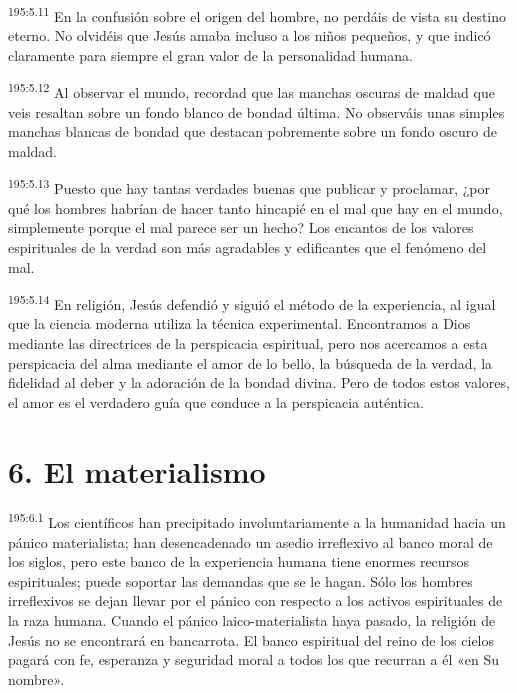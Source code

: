 \par 
\textsuperscript{195:5.11} En la confusión sobre el origen del hombre, no perdáis de vista su destino eterno. No olvidéis que Jesús amaba incluso a los niños pequeños, y que indicó claramente para siempre el gran valor de la personalidad humana.

\par 
\textsuperscript{195:5.12} Al observar el mundo, recordad que las manchas oscuras de maldad que veis resaltan sobre un fondo blanco de bondad última. No observáis unas simples manchas blancas de bondad que destacan pobremente sobre un fondo oscuro de maldad.

\par 
\textsuperscript{195:5.13} Puesto que hay tantas verdades buenas que publicar y proclamar, ¿por qué los hombres habrían de hacer tanto hincapié en el mal que hay en el mundo, simplemente porque el mal parece ser un hecho? Los encantos de los valores espirituales de la verdad son más agradables y edificantes que el fenómeno del mal.

\par 
\textsuperscript{195:5.14} En religión, Jesús defendió y siguió el método de la experiencia, al igual que la ciencia moderna utiliza la técnica experimental. Encontramos a Dios mediante las directrices de la perspicacia espiritual, pero nos acercamos a esta perspicacia del alma mediante el amor de lo bello, la búsqueda de la verdad, la fidelidad al deber y la adoración de la bondad divina. Pero de todos estos valores, el amor es el verdadero guía que conduce a la perspicacia auténtica.

\section*{6. El materialismo}
\par 
\textsuperscript{195:6.1} Los científicos han precipitado involuntariamente a la humanidad hacia un pánico materialista; han desencadenado un asedio irreflexivo al banco moral de los siglos, pero este banco de la experiencia humana tiene enormes recursos espirituales; puede soportar las demandas que se le hagan. Sólo los hombres irreflexivos se dejan llevar por el pánico con respecto a los activos espirituales de la raza humana. Cuando el pánico laico-materialista haya pasado, la religión de Jesús no se encontrará en bancarrota. El banco espiritual del reino de los cielos pagará con fe, esperanza y seguridad moral a todos los que recurran a él «en Su nombre».

